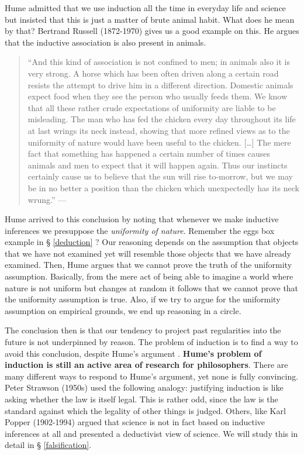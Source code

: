 \documentclass[
]{book}
\begin{document}
Hume admitted that we use induction all the time in everyday life and science but insisted that this is just a matter of brute animal habit. What does he mean by that? Bertrand Russell (1872-1970) gives us a good example on this. He argues that the inductive association is also present in animals.

\begin{quote}
``And this kind of association is not confined to men; in animals also it is very strong. A horse which has been often driven along a certain road resists the attempt to drive him in a different direction. Domestic animals expect food when they see the person who usually feeds them. We know that all these rather crude expectations of uniformity are liable to be misleading. The man who has fed the chicken every day throughout its life at last wrings its neck instead, showing that more refined views as to the uniformity of nature would have been useful to the chicken. {[}\ldots{]} The mere fact that something has happened a certain number of times causes animals and men to expect that it will happen again. Thus our instincts certainly cause us to believe that the sun will rise to-morrow, but we may be in no better a position than the chicken which unexpectedly has its neck wrung.'' --- \citep{russell2001problems}
\end{quote}

Hume arrived to this conclusion by noting that whenever we make inductive inferences we presuppose the \emph{uniformity of nature}. Remember the eggs box example in § \ref{deduction} ? Our reasoning depends on the assumption that objects that we have not examined yet will resemble those objects that we have already examined. Then, Hume argues that we cannot prove the truth of the uniformity assumption. Basically, from the mere act of being able to imagine a world where nature is not uniform but changes at random it follows that we cannot prove that the uniformity assumption is true. Also, if we try to argue for the uniformity assumption on empirical grounds, we end up reasoning in a circle.

The conclusion then is that our tendency to project past regularities into the future is not underpinned by reason. The problem of induction is to find a way to avoid this conclusion, despite Hume's argument \citep{sep-induction-problem}. \textbf{Hume's problem of induction is still an active area of research for philosophers}. There are many different ways to respond to Hume's argument, yet none is fully convincing. Peter Strawson (1950s) used the following analogy: justifying induction is like asking whether the law is itself legal. This is rather odd, since the law is the standard against which the legality of other things is judged. Others, like Karl Popper (1902-1994) argued that science is not in fact based on inductive inferences at all and presented a deductivist view of science. We will study this in detail in § \ref{falsification}.
\end{document}
